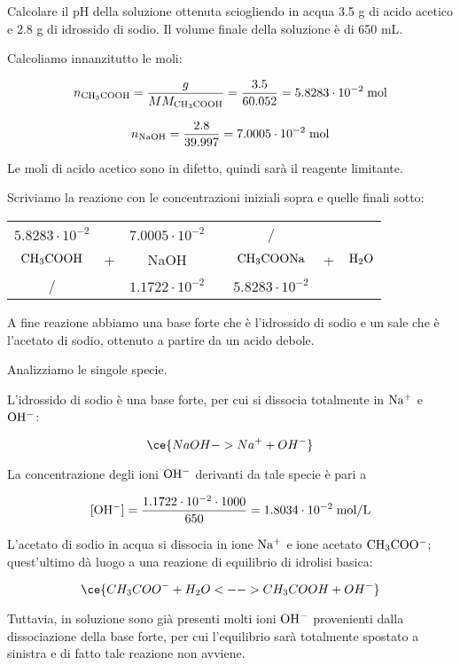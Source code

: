 \begin{esercizio}
    Calcolare il pH della soluzione ottenuta sciogliendo in acqua 3.5 g di acido acetico e 2.8 g di idrossido di sodio. Il volume finale della soluzione è di 650 mL.
\end{esercizio}
\begin{soluzione}
    Calcoliamo innanzitutto le moli:

$$n_{\rm CH_3COOH}=\frac{g}{MM_{\rm CH_3COOH}}=\frac{3.5}{60.052}=5.8283 \cdot 10^{-2} \; \rm mol$$

$$n_{\rm NaOH}=\frac{2.8}{39.997}=7.0005 \cdot 10^{-2} \; \rm mol$$

Le moli di acido acetico sono in difetto, quindi sarà il reagente limitante.

Scriviamo la reazione con le concentrazioni iniziali sopra e quelle finali sotto:

\begin{center}
    \begin{tabular}{ccccccc}
        $5.8283 \cdot 10^{-2}$ &  & $7.0005 \cdot 10^{-2}$ & & / &&\\
        $\rm CH_3COOH$ & + & NaOH & \ce{->} & $\rm CH_3COONa$ & + & $\rm H_2O$\\
        / & & $1.1722 \cdot 10^{-2}$ & & $5.8283 \cdot 10^{-2}$&&\\
    \end{tabular}
\end{center}

A fine reazione abbiamo una base forte che è l'idrossido di sodio e un sale che è l'acetato di sodio, ottenuto a partire da un acido debole.

Analizziamo le singole specie.

L'idrossido di sodio è una base forte, per cui si dissocia totalmente in $\rm Na^+$ e $\rm OH^-$:

$$\ce{NaOH -> Na^+ + OH^-}$$

La concentrazione degli ioni $\rm OH^-$ derivanti da tale specie è pari a

$$[\rm OH^-]=\frac{1.1722 \cdot 10^{-2} \cdot 1000}{650}=1.8034 \cdot 10^{-2} \; \rm mol/L$$

L'acetato di sodio in acqua si dissocia in ione $\rm Na^+$ e ione acetato $\rm CH_3COO^-$; quest'ultimo dà luogo a una reazione di equilibrio di idrolisi basica:

$$\ce{CH_3COO^- + H_2O <--> CH_3COOH + OH^-}$$

Tuttavia, in soluzione sono già presenti molti ioni $\rm OH^-$ provenienti dalla dissociazione della base forte, per cui l'equilibrio sarà totalmente spostato a sinistra e di fatto tale reazione non avviene.


\end{soluzione}
